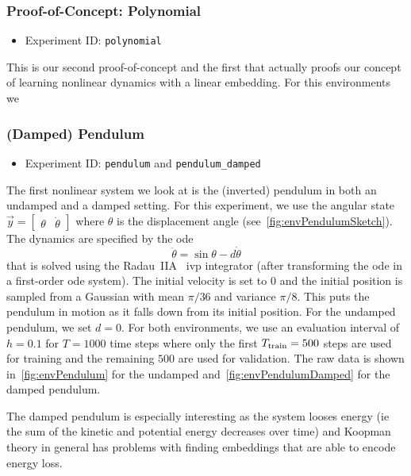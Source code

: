 		\subsubsection{Proof-of-Concept: Polynomial}
			\begin{itemize}
				\item Experiment ID: \texttt{polynomial}
			\end{itemize}

			This is our second proof-of-concept and the first that actually proofs our concept of learning nonlinear dynamics with a linear embedding. For this environments we

		\subsubsection{(Damped) Pendulum}
			\begin{itemize}
				\item Experiment ID: \texttt{pendulum} and \texttt{pendulum\_damped}
			\end{itemize}

			The first nonlinear system we look at is the (inverted) pendulum in both an undamped and a damped setting. For this experiment, we use the angular state \( \vec{y} = \begin{bmatrix} \theta & \dot{\theta} \end{bmatrix} \) where \(\theta\) is the displacement angle (see~\autoref{fig:envPendulumSketch}). The dynamics are specified by the \ac{ode}
			\begin{equation*}
				\ddot{\theta} = \sin\theta - d \dot{\theta}
			\end{equation*}
			that is solved using the Radau~IIA~\cite{guglielmiImplementingRadauIIA2001} \ac{ivp} integrator (after transforming the \ac{ode} in a first-order \ac{ode} system). The initial velocity is set to \(0\) and the initial position is sampled from a Gaussian with mean \( \pi/36 \) and variance \( \pi/8 \). This puts the pendulum in motion as it falls down from its initial position. For the undamped pendulum, we set \( d = 0 \). For both environments, we use an evaluation interval of \( h = 0.1 \) for \( T = 1000 \) time steps where only the first \( T_{\mathrm{train}} = 500 \) steps are used for training and the remaining \(500\) are used for validation. The raw data is shown in~\autoref{fig:envPendulum} for the undamped and~\autoref{fig:envPendulumDamped} for the damped pendulum.

			The damped pendulum is especially interesting as the system looses energy (\ac{ie} the sum of the kinetic and potential energy decreases over time) and Koopman theory in general has problems with finding embeddings that are able to encode energy loss.

